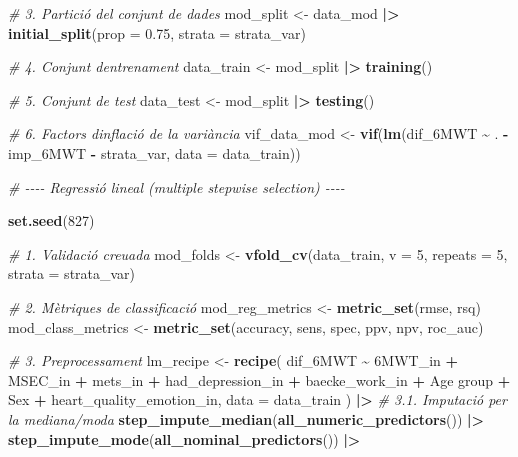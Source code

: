 \documentclass[CAT]{TFUOC}%
\newenvironment{Shaded}{\begin{snugshade}}{\end{snugshade}}
\newcommand{\AttributeTok}[1]{\textcolor[rgb]{0.13,0.29,0.53}{#1}}
\newcommand{\CommentTok}[1]{\textcolor[rgb]{0.56,0.35,0.01}{\textit{#1}}}
\newcommand{\DecValTok}[1]{\textcolor[rgb]{0.00,0.00,0.81}{#1}}
\newcommand{\FloatTok}[1]{\textcolor[rgb]{0.00,0.00,0.81}{#1}}
\newcommand{\FunctionTok}[1]{\textcolor[rgb]{0.13,0.29,0.53}{\textbf{#1}}}
\newcommand{\NormalTok}[1]{#1}
\newcommand{\OtherTok}[1]{\textcolor[rgb]{0.56,0.35,0.01}{#1}}
\newcommand{\SpecialCharTok}[1]{\textcolor[rgb]{0.81,0.36,0.00}{\textbf{#1}}}
\newcommand{\StringTok}[1]{\textcolor[rgb]{0.31,0.60,0.02}{#1}}
\begin{document}
\begin{Shaded}
\begin{Highlighting}[]
\CommentTok{\# 3. Partició del conjunt de dades}
\NormalTok{mod\_split }\OtherTok{\textless{}{-}}\NormalTok{ data\_mod }\SpecialCharTok{|\textgreater{}} 
  \FunctionTok{initial\_split}\NormalTok{(}\AttributeTok{prop =} \FloatTok{0.75}\NormalTok{, }\AttributeTok{strata =}\NormalTok{ strata\_var)}

\CommentTok{\# 4. Conjunt d\textquotesingle{}entrenament}
\NormalTok{data\_train }\OtherTok{\textless{}{-}}\NormalTok{ mod\_split }\SpecialCharTok{|\textgreater{}}
  \FunctionTok{training}\NormalTok{()}

\CommentTok{\# 5. Conjunt de test}
\NormalTok{data\_test }\OtherTok{\textless{}{-}}\NormalTok{ mod\_split }\SpecialCharTok{|\textgreater{}}
  \FunctionTok{testing}\NormalTok{()}

\CommentTok{\# 6. Factors d\textquotesingle{}inflació de la variància}
\NormalTok{vif\_data\_mod }\OtherTok{\textless{}{-}} \FunctionTok{vif}\NormalTok{(}\FunctionTok{lm}\NormalTok{(dif\_6MWT }\SpecialCharTok{\textasciitilde{}}\NormalTok{ . }\SpecialCharTok{{-}}\NormalTok{ imp\_6MWT }\SpecialCharTok{{-}}\NormalTok{ strata\_var, }\AttributeTok{data =}\NormalTok{ data\_train))}

\CommentTok{\# {-}{-}{-}{-} Regressió lineal (multiple stepwise selection) {-}{-}{-}{-}}

\FunctionTok{set.seed}\NormalTok{(}\DecValTok{827}\NormalTok{)}

\CommentTok{\# 1. Validació creuada}
\NormalTok{mod\_folds }\OtherTok{\textless{}{-}} \FunctionTok{vfold\_cv}\NormalTok{(data\_train, }\AttributeTok{v =} \DecValTok{5}\NormalTok{, }\AttributeTok{repeats =} \DecValTok{5}\NormalTok{, }\AttributeTok{strata =}\NormalTok{ strata\_var)}

\CommentTok{\# 2. Mètriques de classificació}
\NormalTok{mod\_reg\_metrics }\OtherTok{\textless{}{-}} \FunctionTok{metric\_set}\NormalTok{(rmse, rsq)}
\NormalTok{mod\_class\_metrics }\OtherTok{\textless{}{-}} \FunctionTok{metric\_set}\NormalTok{(accuracy, sens, spec, ppv, npv, roc\_auc)}

\CommentTok{\# 3. Preprocessament}
\NormalTok{lm\_recipe }\OtherTok{\textless{}{-}} \FunctionTok{recipe}\NormalTok{(}
\NormalTok{  dif\_6MWT }\SpecialCharTok{\textasciitilde{}} \StringTok{\textasciigrave{}}\AttributeTok{6MWT\_in}\StringTok{\textasciigrave{}} \SpecialCharTok{+}\NormalTok{ MSEC\_in }\SpecialCharTok{+}\NormalTok{ mets\_in }\SpecialCharTok{+}\NormalTok{ had\_depression\_in }\SpecialCharTok{+} 
\NormalTok{    baecke\_work\_in }\SpecialCharTok{+} \StringTok{\textasciigrave{}}\AttributeTok{Age group}\StringTok{\textasciigrave{}} \SpecialCharTok{+}\NormalTok{ Sex }\SpecialCharTok{+}\NormalTok{ heart\_quality\_emotion\_in, }
  \AttributeTok{data =}\NormalTok{ data\_train}
\NormalTok{) }\SpecialCharTok{|\textgreater{}} 
  \CommentTok{\# 3.1. Imputació per la mediana/moda}
  \FunctionTok{step\_impute\_median}\NormalTok{(}\FunctionTok{all\_numeric\_predictors}\NormalTok{()) }\SpecialCharTok{|\textgreater{}} 
  \FunctionTok{step\_impute\_mode}\NormalTok{(}\FunctionTok{all\_nominal\_predictors}\NormalTok{()) }\SpecialCharTok{|\textgreater{}} 
  

\end{Highlighting}
\end{Shaded}
\end{document}
